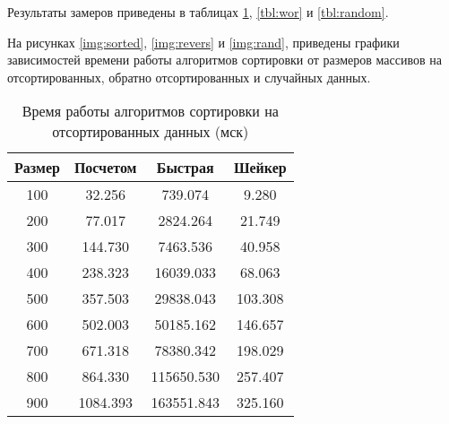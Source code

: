 Результаты замеров приведены в таблицах \ref{tbl:best}, \ref{tbl:wor} и \ref{tbl:random}.

На рисунках \ref{img:sorted}, \ref{img:revers} и \ref{img:rand}, приведены графики зависимостей времени работы алгоритмов сортировки от размеров массивов на отсортированных, обратно отсортированных и случайных данных.



\FloatBarrier

\begin{table}[h]
	\begin{center}
		\caption{Время работы алгоритмов сортировки на отсортированных данных (мск)}
		\label{tbl:best}
		\begin{tabular}{|c|c|c|c|}
			\hline
			 Размер & Посчетом &  Быстрая &  Шейкер \\
			\hline
			100 & 32.256 & 739.074 & 9.280\\
			\hline
			200 & 77.017 & 2824.264 & 21.749\\
			\hline
			300 & 144.730 & 7463.536 & 40.958 \\
			\hline
			400 & 238.323 & 16039.033 & 68.063 \\
			\hline
			500 & 357.503 & 29838.043 & 103.308 \\
			\hline
			600 & 502.003 & 50185.162 & 146.657 \\
			\hline
			700 & 671.318 & 78380.342 & 198.029 \\
			\hline
			800 & 864.330 & 115650.530 & 257.407 \\
			\hline
			900 & 1084.393 & 163551.843 & 325.160 \\
			\hline
		\end{tabular}
	\end{center}
\end{table}
\FloatBarrier



\FloatBarrier


